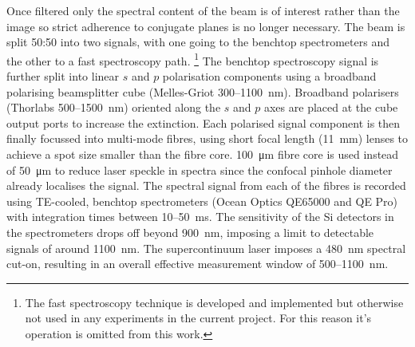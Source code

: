 \documentclass{article}
\begin{document}

Once filtered only the spectral content of the beam is of interest rather than the image so strict adherence to conjugate planes is no longer necessary. The beam is split 50:50 into two signals, with one going to the benchtop spectrometers and the other to a fast spectroscopy path.%
\footnote{The fast spectroscopy technique is developed and implemented but otherwise not used in any experiments in the current project. For this reason it's operation is omitted from this work.}
The benchtop spectroscopy signal is further split into linear $s$ and $p$ polarisation components using a broadband polarising beamsplitter cube (Melles-Griot 300--\SI{1100}{nm}). Broadband polarisers (Thorlabs 500--\SI{1500}{nm}) oriented along the $s$ and $p$ axes are placed at the cube output ports to increase the extinction. Each polarised signal component is then finally focussed into multi-mode fibres, using short focal length (\SI{11}{mm}) lenses to achieve a spot size smaller than the fibre core. \SI{100}{\micro\metre} fibre core is used instead of \SI{50}{\micro\metre} to reduce laser speckle in spectra since the confocal pinhole diameter already localises the signal.
The spectral signal from each of the fibres is recorded using TE-cooled, benchtop spectrometers (Ocean Optics QE65000 and QE Pro) with integration times between 10--\SI{50}{ms}. The sensitivity of the Si detectors in the spectrometers drops off beyond \SI{900}{nm}, imposing a limit to detectable signals of around \SI{1100}{nm}. The supercontinuum laser imposes a \SI{480}{nm} spectral cut-on, resulting in an overall effective measurement window of 500--\SI{1100}{nm}.
\end{document}
